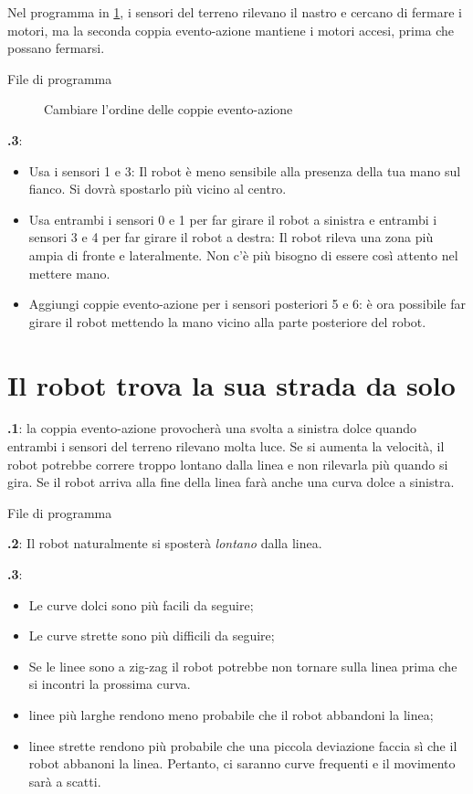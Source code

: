 \documentclass[12pt,a4paper,italian]{article}
\begin{document}
Nel programma in \cref{fig.change}, i sensori del terreno
rilevano il nastro e cercano di fermare i motori, ma la seconda coppia evento-azione
mantiene i motori accesi, prima che possano fermarsi.

{\raggedleft \hfill File di programma }

\begin{figure}[hbt]
\begin{center}
\caption{Cambiare l'ordine delle coppie evento-azione}\label{fig.change}
\end{center}
\end{figure}

\textbf{\thesection.3}: 
\begin{itemize}
\item Usa i sensori 1 e 3: Il robot è meno sensibile alla presenza
della tua mano sul fianco. Si dovrà spostarlo più vicino al centro.
\item Usa entrambi i sensori 0 e 1 per far girare il robot a sinistra e entrambi i sensori 3
e 4 per far girare il robot a destra: Il robot rileva una zona più ampia di
fronte e lateralmente. Non c'è più bisogno di essere così attento nel mettere mano.
\item Aggiungi coppie evento-azione per i sensori posteriori 5 e 6: è ora possibile
far girare il robot mettendo la mano vicino alla parte posteriore del robot.
\end{itemize}


\section{Il robot trova la sua strada da solo}

\textbf{\thesection.1}: la coppia evento-azione 
provocherà una svolta a sinistra dolce quando entrambi i sensori del terreno rilevano molta
luce. Se si aumenta la velocità, il robot potrebbe correre troppo lontano dalla
linea e non rilevarla più quando si gira. Se il robot arriva alla fine della
linea farà anche una curva dolce a sinistra.

{\raggedleft \hfill File di programma }

\textbf{\thesection.2}: Il robot naturalmente si sposterà \emph{lontano}  dalla linea.

\textbf{\thesection.3}:
\begin {itemize}
\item Le curve dolci sono più facili da seguire;
\item Le curve strette sono più difficili da seguire;
\item Se le linee sono a zig-zag il robot potrebbe non tornare sulla linea prima
che si incontri la prossima curva.
\item linee più larghe rendono meno probabile che il robot abbandoni la linea;
\item linee strette  rendono più probabile che una piccola deviazione faccia sì che 
il robot abbanoni la linea. Pertanto, ci saranno curve frequenti
e il movimento sarà a scatti.
\end{itemize}
\end{document}
